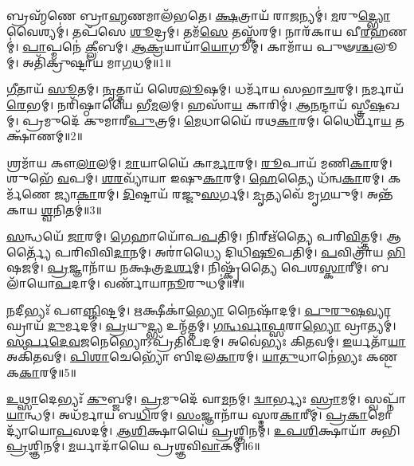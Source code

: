 \setcounter{anuvakam}{0}

𑌬𑍍𑌰𑌹𑍍𑌮᳴𑌣𑍇 𑌬𑍍𑌰𑌾\-\ul{𑌹𑍍𑌮}\-𑌣𑌮𑌾𑌲᳴𑌭𑌤𑍇।
\-\ul{𑌕𑍍𑌷}\-𑌤𑍍𑌰𑌾𑌯᳴ 𑌰𑌾\-\ul{𑌜}\-𑌨𑍍𑌯𑌮𑍍॑।
\-\ul{𑌮}\-𑌰𑍁\-\ul{𑌦𑍍𑌭𑍍𑌯𑍋} 𑌵𑍈𑌶𑍍𑌯𑌮𑍍॑।
𑌤𑌪᳴𑌸𑍇 \ul{𑌶𑍂}\-𑌦𑍍𑌰𑌮𑍍।
𑌤𑌮᳴\-\ul{𑌸𑍇} 𑌤𑌸𑍍𑌕᳴𑌰𑌮𑍍।
𑌨𑌾𑌰᳴𑌕𑌾𑌯 𑌵𑍀\-\ul{𑌰}\-𑌹𑌣𑌮𑍍॑।
\-\ul{𑌪𑌾}\-𑌪𑍍𑌮𑌨𑍇॑ \ul{𑌕𑍍𑌲𑍀}\-𑌬𑌮𑍍।
\-\ul{𑌆}\-\-\ul{𑌕𑍍𑌰}\-𑌯𑌾𑌯𑌾᳴\-\ul{𑌯𑍋}\-𑌗𑍂𑌮𑍍।
𑌕𑌾𑌮𑌾᳴𑌯 𑌪𑍁𑍟\-\ul{𑌶𑍍𑌚}\-𑌲𑍂𑌮𑍍।
𑌅𑌤𑌿᳴𑌕𑍍𑌰𑍁𑌷𑍍𑌟𑌾𑌯 𑌮𑌾\-\ul{𑌗}\-𑌧𑌮𑍍॥1॥

\-\ul{𑌗𑍀}\-𑌤𑌾𑌯᳴ \ul{𑌸𑍂}\-𑌤𑌮𑍍।
\-\ul{𑌨𑍃}\-𑌤𑍍𑌤𑌾𑌯᳴ 𑌶𑍈\-\ul{𑌲𑍂}\-𑌷𑌮𑍍।
𑌧𑌰𑍍𑌮𑌾᳴𑌯 𑌸𑌭𑌾\-\ul{𑌚}\-𑌰𑌮𑍍।
\-\ul{𑌨}\-𑌰𑍍𑌮𑌾𑌯᳴ \ul{𑌰𑍇}\-𑌭𑌮𑍍।
𑌨𑌰𑌿᳴𑌷𑍍𑌠𑌾𑌯𑍈 𑌭𑍀\-\ul{𑌮}\-𑌲𑌮𑍍।
𑌹𑌸𑌾᳴\-\ul{𑌯} 𑌕𑌾𑌰𑌿𑌮𑍍॑।
\-\ul{𑌆}\-\-\ul{𑌨}\-𑌨𑍍𑌦𑌾𑌯᳴ 𑌸𑍍𑌤𑍍𑌰𑍀\-\ul{𑌷}\-𑌖𑌮𑍍।
𑌪𑍍𑌰𑌮𑍁𑌦𑍇᳴ 𑌕𑍁𑌮𑌾𑌰𑍀\-\ul{𑌪𑍁}\-𑌤𑍍𑌰𑌮𑍍।
\-\ul{𑌮𑍇}\-𑌧𑌾𑌯𑍈᳴ 𑌰𑌥\-\ul{𑌕𑌾}\-𑌰𑌮𑍍।
𑌧𑍈𑌰𑍍𑌯𑌾᳴\-\ul{𑌯} 𑌤𑌕𑍍𑌷𑌾᳴𑌣𑌮𑍍॥2॥

𑌶𑍍𑌰𑌮𑌾᳴𑌯 𑌕𑍗\-\ul{𑌲𑌾}\-𑌲𑌮𑍍।
\-\ul{𑌮𑌾}\-𑌯𑌾𑌯𑍈᳴ 𑌕𑌾\-\ul{𑌰𑍍𑌮𑌾}\-𑌰𑌮𑍍।
\-\ul{𑌰𑍂}\-𑌪𑌾𑌯᳴ 𑌮𑌣𑌿\-\ul{𑌕𑌾}\-𑌰𑌮𑍍।
𑌶𑍁𑌭𑍇᳴ \ul{𑌵}\-𑌪𑌮𑍍।
\-\ul{𑌶}\-\-\ul{𑌰}\-𑌵𑍍𑌯𑌾᳴𑌯𑌾 𑌇𑌷𑍁\-\ul{𑌕𑌾}\-𑌰𑌮𑍍।
\-\ul{𑌹𑍇}\-𑌤𑍍𑌯𑍈 𑌧᳴𑌨𑍍𑌵\-\ul{𑌕𑌾}\-𑌰𑌮𑍍।
𑌕𑌰𑍍𑌮᳴𑌣𑍇 𑌜𑍍𑌯𑌾\-\ul{𑌕𑌾}\-𑌰𑌮𑍍।
\-\ul{𑌦𑌿}\-𑌷𑍍𑌟𑌾𑌯᳴ 𑌰𑌜𑍍𑌜𑍁\-\ul{𑌸}\-𑌰𑍍𑌗𑌮𑍍।
\-\ul{𑌮𑍃}\-𑌤𑍍𑌯𑌵𑍇᳴ 𑌮𑍃\-\ul{𑌗}\-𑌯𑍁𑌮𑍍।
𑌅𑌨𑍍𑌤᳴𑌕𑌾𑌯 \ul{𑌶𑍍𑌵}\-𑌨𑌿𑌤𑌮𑍍॑॥3॥

\-\ul{𑌸}\-𑌨𑍍𑌧𑌯𑍇᳴ \ul{𑌜𑌾}\-𑌰𑌮𑍍।
\-\ul{𑌗𑍇}\-𑌹𑌾𑌯𑍋᳴𑌪\-\ul{𑌪}\-𑌤𑌿𑌮𑍍।
𑌨𑌿𑌰𑍍\mbox{}𑌋᳴𑌤𑍍𑌯𑍈 𑌪𑌰𑌿\-\ul{𑌵𑌿}\-𑌤𑍍𑌤𑌮𑍍।
𑌆𑌰𑍍𑌤𑍍𑌯𑍈᳴ 𑌪𑌰𑌿𑌵𑌿𑌵𑌿\-\ul{𑌦𑌾}\-𑌨𑌮𑍍।
𑌅𑌰𑌾॑𑌧𑍍𑌯𑍈 𑌦𑌿𑌧𑌿\-\ul{𑌷𑍂}\-𑌪𑌤𑌿𑌮𑍍॑।
\-\ul{𑌪}\-𑌵𑌿𑌤𑍍𑌰𑌾᳴𑌯 \ul{𑌭𑌿}\-𑌷𑌜𑌮𑍍॑।
\-\ul{𑌪𑍍𑌰}\-𑌜𑍍𑌞𑌾𑌨𑌾᳴𑌯 𑌨𑌕𑍍𑌷𑌤𑍍𑌰\-\ul{𑌦}\-\-\ul{𑌰𑍍}\-𑌶𑌮𑍍।
𑌨𑌿𑌷𑍍𑌕𑍃᳴𑌤𑍍𑌯𑍈 𑌪𑍇𑌶\-\ul{𑌸𑍍𑌕𑌾}\-𑌰𑍀𑌮𑍍।
𑌬𑌲𑌾᳴𑌯𑍋\-\ul{𑌪}\-𑌦𑌾𑌮𑍍।
𑌵𑌰𑍍𑌣𑌾᳴𑌯𑌾\-\ul{𑌨𑍂}\-𑌰𑍁𑌧𑌮𑍍॑॥4॥

\-\ul{𑌨}\-𑌦𑍀𑌭𑍍𑌯𑌃᳴ 𑌪𑍗\-\ul{𑌞𑍍𑌜𑌿}\-𑌷𑍍𑌟𑌮𑍍।
\-\ul{𑌋}\-𑌕𑍍𑌷𑍀𑌕𑌾॑\-\ul{𑌭𑍍𑌯𑍋} 𑌨𑍈𑌷𑌾᳴𑌦𑌮𑍍।
\-\ul{𑌪𑍁}\-\-\ul{𑌰𑍁}\-\-\ul{𑌷}\-\-\ul{𑌵𑍍𑌯𑌾}\-𑌘𑍍𑌰𑌾𑌯᳴ \ul{𑌦𑍁}\-𑌰𑍍𑌮𑌦𑌮𑍍॑।
\-\ul{𑌪𑍍𑌰}\-𑌯𑍁\-\ul{𑌦𑍍𑌭𑍍𑌯} 𑌉𑌨𑍍𑌮᳴𑌤𑍍𑌤𑌮𑍍।
\-\ul{𑌗}\-\-\ul{𑌨𑍍𑌧}\-\-\ul{𑌰𑍍𑌵𑌾}\-\-\ul{𑌫𑍍𑌸}\-𑌰𑌾\-\ul{𑌭𑍍𑌯𑍋} 𑌵𑍍𑌰𑌾𑌤𑍍𑌯𑌮𑍍॑।
\-\ul{𑌸}\-\-\ul{𑌰𑍍𑌪}\-\-\ul{𑌦𑍇}\-\-\ul{𑌵}\-\-\-\ul{𑌜}\-𑌨𑍇𑌭𑍍𑌯𑍋\-𑌽𑌪𑍍𑌰᳴𑌤𑌿𑌪𑌦𑌮𑍍।
𑌅𑌵𑍇॑𑌭𑍍𑌯𑌃 𑌕𑌿\-\ul{𑌤}\-𑌵𑌮𑍍।
\-\ul{𑌇}\-𑌰𑍍𑌯𑌤𑌾᳴\-\ul{𑌯𑌾} 𑌅𑌕𑌿᳴𑌤𑌵𑌮𑍍।
\-\ul{𑌪𑌿}\-\-\ul{𑌶𑌾}\-𑌚𑍇𑌭𑍍𑌯𑍋᳴ 𑌬𑌿𑌦𑌲\-\ul{𑌕𑌾}\-𑌰𑌮𑍍।
\-\ul{𑌯𑌾}\-\-\ul{𑌤𑍁}\-𑌧𑌾𑌨𑍇॑𑌭𑍍𑌯𑌃 𑌕𑌣𑍍𑌟𑌕\-\ul{𑌕𑌾}\-𑌰𑌮𑍍॥5॥

\-\ul{𑌉}\-\-\ul{𑌥𑍍𑌸𑌾}\-𑌦𑍇𑌭𑍍𑌯𑌃᳴ \ul{𑌕𑍁}\-𑌬𑍍𑌜𑌮𑍍।
\-\ul{𑌪𑍍𑌰}\-𑌮𑍁𑌦𑍇᳴ 𑌵𑌾\-\ul{𑌮}\-𑌨𑌮𑍍।
\-\ul{𑌦𑍍𑌵𑌾}\-𑌰𑍍𑌭𑍍𑌯𑌃 \ul{𑌸𑍍𑌰𑌾}\-𑌮𑌮𑍍।
𑌸𑍍𑌵𑌪𑍍𑌨𑌾᳴\-\ul{𑌯𑌾}\-𑌨𑍍𑌧𑌮𑍍।
𑌅𑌧᳴𑌰𑍍𑌮𑌾𑌯 𑌬\-\ul{𑌧𑌿}\-𑌰𑌮𑍍।
\-\ul{𑌸𑌂}\-𑌜𑍍𑌞𑌾𑌨𑌾᳴𑌯 𑌸𑍍𑌮𑌰\-\ul{𑌕𑌾}\-𑌰𑍀𑌮𑍍।
\-\ul{𑌪𑍍𑌰}\-\-\ul{𑌕𑌾}\-𑌮𑍋𑌦𑍍𑌯𑌾᳴𑌯𑍋\-\ul{𑌪}\-𑌸𑌦𑌮𑍍॑।
\-\ul{𑌆}\-\-\ul{𑌶𑌿}\-𑌕𑍍𑌷𑌾𑌯𑍈॑ \ul{𑌪𑍍𑌰}\-𑌶𑍍𑌞𑌿𑌨𑌮𑍍॑।
\-\ul{𑌉}\-\-\ul{𑌪}\-\-\ul{𑌶𑌿}\-𑌕𑍍𑌷𑌾𑌯𑌾᳴ 𑌅𑌭𑌿\-\ul{𑌪𑍍𑌰}\-𑌶𑍍𑌞𑌿𑌨𑌮𑍍॑।
\-\ul{𑌮}\-𑌰𑍍𑌯𑌾𑌦𑌾᳴𑌯𑍈 𑌪𑍍𑌰𑌶𑍍𑌞𑌵𑌿\-\ul{𑌵𑌾}\-𑌕𑌮𑍍॥6॥

